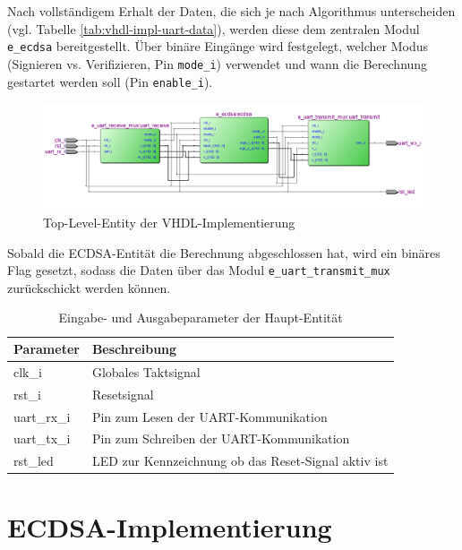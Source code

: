 Nach vollständigem Erhalt der Daten, die sich je nach Algorithmus unterscheiden (vgl. Tabelle \ref{tab:vhdl-impl-uart-data}), werden diese dem zentralen Modul \texttt{e\_ecdsa} bereitgestellt. Über binäre Eingänge wird festgelegt, welcher Modus (Signieren vs. Verifizieren, Pin \texttt{mode\_i}) verwendet und wann die Berechnung gestartet werden soll (Pin \texttt{enable\_i}).
 
\begin{figure}[thb]
	\centering
	\includegraphics[width=\textwidth]{bilder/tle}
	\caption{Top-Level-Entity der VHDL-Implementierung}
	\label{fig:vhdl-impl-tle}
\end{figure}

Sobald die ECDSA-Entität die Berechnung abgeschlossen hat, wird ein binäres Flag gesetzt, sodass die Daten über das Modul \texttt{e\_uart\_transmit\_mux} zurückschickt werden können.  

\begin{table} [h]
	\centering 
	\begin{tabular}{ | p{3cm} | p{12cm} | }
		\hline
		\textbf{Parameter} & \textbf{Beschreibung}\\
		\hline
		clk\_i & Globales Taktsignal \\
		\hline
		rst\_i & Resetsignal \\
		\hline
		uart\_rx\_i & Pin zum Lesen der UART-Kommunikation \\
		\hline
		uart\_tx\_i & Pin zum Schreiben der UART-Kommunikation \\
		\hline
		rst\_led & LED zur Kennzeichnung ob das Reset-Signal aktiv ist \\
		\hline
	\end{tabular}
	\caption{Eingabe- und Ausgabeparameter der Haupt-Entität}
	\label{tab:vhdl-impl-tld-ecdsa-param}
\end{table}


\section{ECDSA-Implementierung}
\label{vhdl-impl-general}

